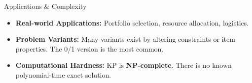 \begin{frame}
\begin{columns}[T]
\begin{column}{0.6\textwidth}
            \begin{alertblock}{Applications \& Complexity}
                \begin{itemize}
                    \item \textbf{Real-world Applications:} Portfolio selection, resource allocation, logistics. \vspace{0.5em}
                    
                    \item \textbf{Problem Variants:} Many variants exist by altering constraints or item properties. The 0/1 version is the most common. \vspace{0.5em}
                    
                    \item \textbf{Computational Hardness:} KP is \textbf{NP-complete}. There is no known polynomial-time exact solution.
                \end{itemize}
            \end{alertblock}
            
        \end{column}
    \end{columns}
\end{frame}